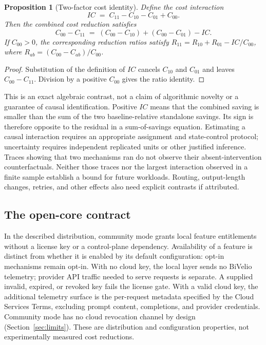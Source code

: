 \documentclass[11pt,a4paper]{article}
\newtheorem{proposition}{Proposition}
\begin{document}
\begin{proposition}[Two-factor cost identity]
Define the cost interaction
\begin{equation}
IC \;=\; C_{11} - C_{10} - C_{01} + C_{00}.
\end{equation}
Then the combined cost reduction satisfies
\begin{equation}
C_{00} - C_{11} \;=\; (C_{00} - C_{10}) + (C_{00} - C_{01}) - IC .
\end{equation}
If $C_{00}>0$, the corresponding reduction ratios satisfy
$R_{11}=R_{10}+R_{01}-IC/C_{00}$, where $R_{ab}=(C_{00}-C_{ab})/C_{00}$.
\end{proposition}

\begin{proof}
Substitution of the definition of $IC$ cancels $C_{10}$ and $C_{01}$ and leaves
$C_{00}-C_{11}$. Division by a positive $C_{00}$ gives the ratio identity.
\end{proof}

This is an exact algebraic contrast, not a claim of algorithmic novelty or a guarantee of causal
identification. Positive $IC$ means that the combined saving is smaller than the sum of the two
baseline-relative standalone savings. Its sign is therefore opposite to the residual in a
sum-of-savings equation. Estimating a causal interaction requires an appropriate assignment and
state-control protocol; uncertainty requires independent replicated units or other justified
inference. Traces showing that two mechanisms ran do not observe their absent-intervention
counterfactuals. Neither those traces nor the largest interaction observed in a finite sample
establish a bound for future workloads. Routing, output-length changes, retries, and other effects
also need explicit contrasts if attributed.

\subsection{The open-core contract}
In the described distribution, community mode grants local feature entitlements without a
license key or a control-plane dependency. Availability of a feature is distinct from whether it
is enabled by its default configuration: opt-in mechanisms remain opt-in. With no cloud key, the
local layer sends no BiVelio telemetry; provider API traffic needed to serve requests is separate.
A supplied invalid, expired, or revoked key fails the license gate. With a valid cloud key, the
additional telemetry surface is the per-request metadata specified by the Cloud Services Terms,
excluding prompt content, completions, and provider credentials. Community mode has no cloud
revocation channel by design (Section~\ref{sec:limits}). These are distribution and configuration
properties, not experimentally measured cost reductions.
\end{document}
